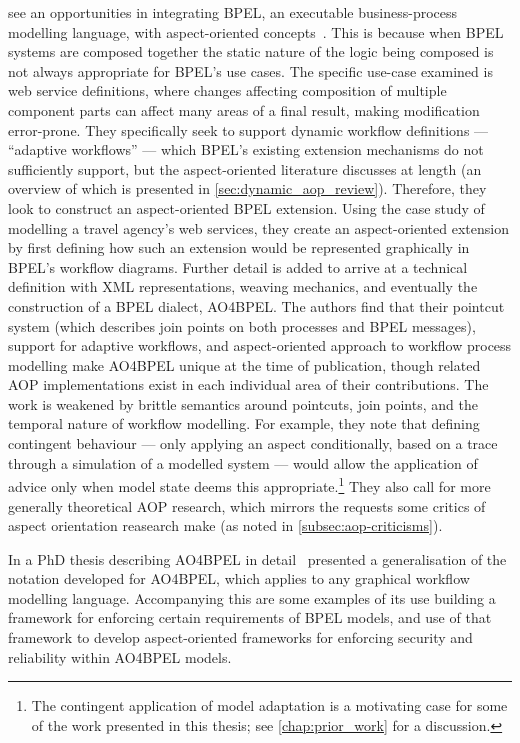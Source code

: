 \citeauthor{charfi2007ao4bpel} see an opportunities in integrating BPEL, an
executable business-process modelling language, with aspect-oriented
concepts~\cite{charfi2007ao4bpel}. This is because when BPEL systems are
composed together the static nature of the logic being composed is not always
appropriate for BPEL's use cases. The specific use-case examined is web service
definitions, where changes affecting composition of multiple component parts can
affect many areas of a final result, making modification error-prone. They
specifically seek to support dynamic workflow definitions --- ``adaptive
workflows'' --- which BPEL's existing extension mechanisms do not sufficiently
support, but the aspect-oriented literature discusses at length (an overview of
which is presented in \cref{sec:dynamic_aop_review}). Therefore, they look to
construct an aspect-oriented BPEL extension. Using the case study of modelling a
travel agency's web services, they create an aspect-oriented extension by first
defining how such an extension would be represented graphically in BPEL's
workflow diagrams. Further detail is added to arrive at a technical definition
with XML representations, weaving mechanics, and eventually the construction of
a BPEL dialect, AO4BPEL. The authors find that their pointcut system (which
describes join points on both processes and BPEL messages), support for adaptive
workflows, and aspect-oriented approach to workflow process modelling make
AO4BPEL unique at the time of publication, though related AOP implementations
exist in each individual area of their contributions. The work is weakened by
brittle semantics around pointcuts, join points, and the temporal nature of
workflow modelling. For example, they note that defining contingent behaviour
--- only applying an aspect conditionally, based on a trace through a simulation
of a modelled system --- would allow the application of advice only when model
state deems this appropriate.\footnote{The contingent application of model
adaptation is a motivating case for some of the work presented in this thesis;
see \cref{chap:prior_work} for a discussion.} They also call for more generally
theoretical AOP research, which mirrors the requests some critics of aspect
orientation reasearch make (as noted in \cref{subsec:aop-criticisms}).

In a PhD thesis describing AO4BPEL in detail~\cite{Charfi2006AspectOrientedWL}
\citeauthor{Charfi2006AspectOrientedWL} presented a generalisation of the
notation developed for AO4BPEL, which applies to any graphical workflow
modelling language. Accompanying this are some examples of its use building a
framework for enforcing certain requirements of BPEL models, and use of that
framework to develop aspect-oriented frameworks for enforcing security and
reliability within AO4BPEL models.

